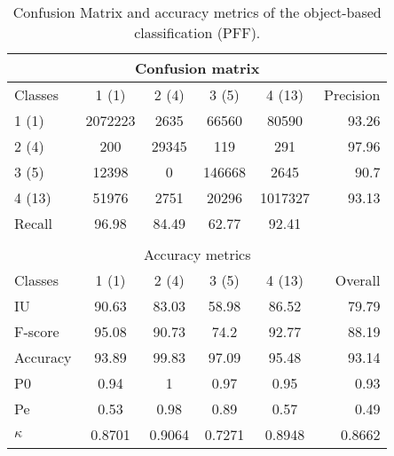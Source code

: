 \begin{table}[H]
\begin{center}
\footnotesize
\begin{tabular}{|l|c|c|c|c|r|}
\hline
\multicolumn{6}{|c|}{Confusion matrix} \\
\hline
 Classes & 1 (1) & 2 (4) & 3 (5) & 4 (13) & Precision \\
\hline
1 (1) & 2072223 & 2635 & 66560 & 80590 & 93.26 \\
\hline
2 (4) & 200 & 29345 & 119 & 291 & 97.96 \\
\hline
3 (5) & 12398 & 0 & 146668 & 2645 & 90.7 \\
\hline
4 (13) & 51976 & 2751 & 20296 & 1017327 & 93.13 \\
\hline
Recall & 96.98 & 84.49 & 62.77 & 92.41 &  \\
\hline
\multicolumn{6}{c}{ } \\
\hline
\multicolumn{6}{|c|}{Accuracy metrics} \\
\hline
 Classes & 1 (1) & 2 (4) & 3 (5) & 4 (13) & Overall \\
\hline
IU & 90.63 & 83.03 & 58.98 & 86.52 & 79.79 \\
\hline
F-score & 95.08 & 90.73 & 74.2 & 92.77 & 88.19 \\
\hline
Accuracy & 93.89 & 99.83 & 97.09 & 95.48 & 93.14 \\
\hline
P0 & 0.94 & 1 & 0.97 & 0.95 & 0.93 \\
\hline
Pe & 0.53 & 0.98 & 0.89 & 0.57 & 0.49 \\
\hline
$\kappa$ & 0.8701 & 0.9064 & 0.7271 & 0.8948 & 0.8662 \\
\hline
\end{tabular}
\caption{Confusion Matrix and accuracy metrics of the object-based classification (PFF).}
\label{table:C3_S3_ss3_classif_PFF}
\end{center}
\end{table}
